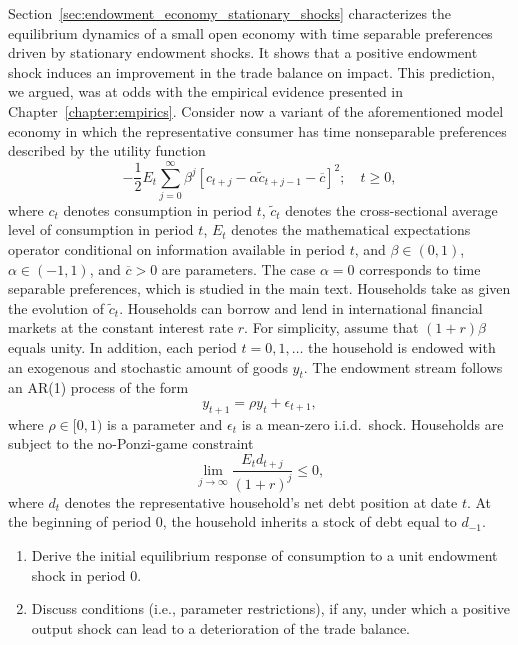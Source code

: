 \begin{exercise} 

Section~\ref{sec:endowment_economy_stationary_shocks} characterizes the equilibrium dynamics  of a small open economy with time separable preferences driven by stationary endowment shocks.
It shows that a positive endowment shock induces an improvement in the trade balance  on impact. This prediction, we argued, was at odds with the empirical evidence presented in Chapter~\ref{chapter:empirics}. Consider now a variant of the aforementioned model economy  in which the representative consumer has time nonseparable  preferences described by the utility function 
\[
-\frac12 E_t \sum_{j=0}^{\infty}
\beta^j [c_{t+j}-\alpha \tilde{c}_{t+j-1}-\overline{c}]^2; 
\quad t\ge0,
\]
where $c_t$ denotes consumption in period $t$,  $\tilde{c}_t$ denotes the cross-sectional average level of consumption in period $t$,  $E_t$ denotes the mathematical expectations operator conditional on information available in period $t$,  and $\beta\in (0,1)$, $\alpha \in (-1,1)$, and  $\overline{c}>0$ are parameters. The case $\alpha=0$ corresponds to time separable preferences, which 
is studied in the main text. Households take as given the evolution of $\tilde{c}_t$. 
Households can borrow and lend in international financial markets at the constant interest rate $r$. For simplicity, assume that  $(1+r)\beta$ equals unity. In addition, each period $t=0, 1, \dots$ the household is endowed with an exogenous and stochastic amount of goods $y_t$. The endowment stream follows an AR(1) process of the form 
\[
y_{t+1} = \rho y_t + \epsilon_{t+1},
\]
where $\rho \in [0,1)$ is a parameter and $\epsilon_t$ is a mean-zero i.i.d.\ shock.  
Households are subject to the no-Ponzi-game constraint 
\[
\lim_{j\rightarrow \infty} \frac{E_td_{t+j}}{(1+r)^j} \le 0,
\]
where $d_t$ denotes the representative household's net debt position at date $t$. At the beginning of  period 0, the household inherits a stock of debt equal to  $d_{-1}$.  


\begin{enumerate}
\item Derive the initial equilibrium  response of consumption to a unit endowment shock in period 0. 
\item Discuss conditions (i.e., parameter restrictions), if any, under which a positive output shock can lead to a deterioration of the trade balance. 
\end{enumerate}

\begin{quote}



\end{quote}
\end{exercise}
